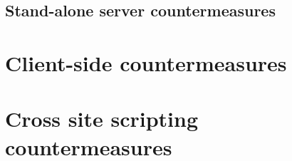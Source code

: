 \subsection{Stand-alone server countermeasures}\label{standalone-server}

\section{Client-side countermeasures}

\section{Cross site scripting countermeasures}\label{xss-countermeasures}
